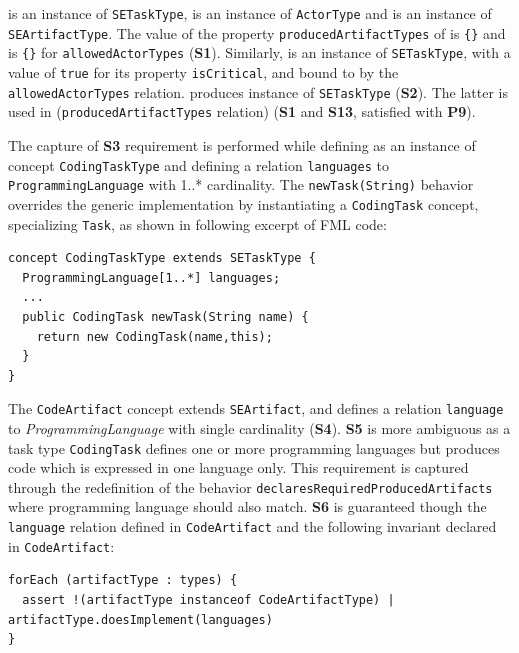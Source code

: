 
 is an instance of \texttt{SETaskType},  is an instance of \texttt{ActorType} and  is an instance of \texttt{SEArtifactType}. The value of the property \texttt{producedArtifactTypes} of  is \texttt{\{}\texttt{\}} and is \texttt{\{}\texttt{\}} for \texttt{allowedActorTypes} (\textbf{S1}). Similarly,  is an instance of \texttt{SETaskType}, with a value of \texttt{true} for its property \texttt{isCritical}, and bound to  by the \texttt{allowedActorTypes} relation.  produces  instance of \texttt{SETaskType} (\textbf{S2}). The latter is used in  (\texttt{producedArtifactTypes} relation) (\textbf{S1} and \textbf{S13}, satisfied with \textbf{P9}). 

The capture of \textbf{S3} requirement is performed while defining  as an instance of concept \texttt{CodingTaskType} and defining a relation \texttt{languages} to \texttt{ProgrammingLanguage} with 1..* cardinality. 
 The \texttt{newTask(String)} behavior overrides the generic implementation by instantiating a \texttt{CodingTask} concept, specializing \texttt{Task}, as shown in following excerpt of FML code:

\begin{lstlisting}
concept CodingTaskType extends SETaskType {
  ProgrammingLanguage[1..*] languages;
  ...
  public CodingTask newTask(String name) { 
    return new CodingTask(name,this); 
  }
}    
\end{lstlisting}

The \texttt{CodeArtifact} concept extends \texttt{SEArtifact}, and defines a relation \texttt{language} to \textit{ProgrammingLanguage} with single cardinality (\textbf{S4}). 
\textbf{S5} is more ambiguous as a task type \texttt{CodingTask} defines one or more programming languages but produces code which is expressed in one language only. This requirement is captured through the redefinition of the behavior \texttt{declaresRequiredProducedArtifacts} where programming language should also match. 
\textbf{S6} is guaranteed though the \texttt{language} relation defined in \texttt{CodeArtifact} and the following invariant declared in \texttt{CodeArtifact}: 
\begin{lstlisting}
forEach (artifactType : types) {
  assert !(artifactType instanceof CodeArtifactType) | artifactType.doesImplement(languages)
}
\end{lstlisting}

